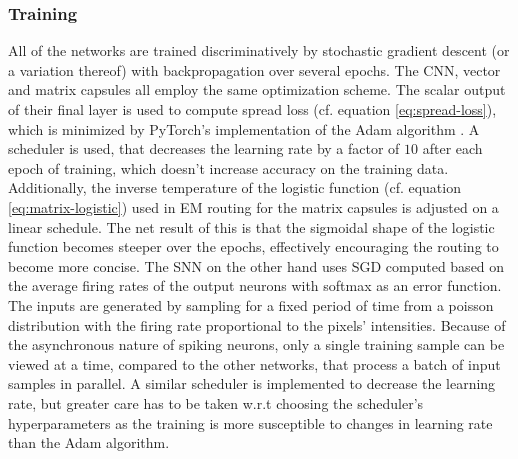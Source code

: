 \subsubsection{Training}
All of the networks are trained discriminatively by stochastic gradient descent (or a variation thereof) with backpropagation over several epochs. The CNN, vector and matrix capsules all employ the same optimization scheme. The scalar output of their final layer is used to compute spread loss (cf. equation \ref{eq:spread-loss}), which is minimized by PyTorch's implementation of the Adam algorithm \cite{kingma2014adam}. A scheduler is used, that decreases the learning rate by a factor of $\num{10}$ after each epoch of training, which doesn't increase accuracy on the training data. Additionally, the inverse temperature of the logistic function (cf. equation \ref{eq:matrix-logistic}) used in EM routing for the matrix capsules is adjusted on a linear schedule. The net result of this is that the sigmoidal shape of the logistic function becomes steeper over the epochs, effectively encouraging the routing to become more concise. The SNN on the other hand uses SGD computed based on the average firing rates of the output neurons with softmax as an error function. The inputs are generated by sampling for a fixed period of time from a poisson distribution with the firing rate proportional to the pixels' intensities. Because of the asynchronous nature of spiking neurons, only a single training sample can be viewed at a time, compared to the other networks, that process a batch of input samples in parallel. A similar scheduler is implemented to decrease the learning rate, but greater care has to be taken w.r.t choosing the scheduler's hyperparameters as the training is more susceptible to changes in learning rate than the Adam algorithm.
